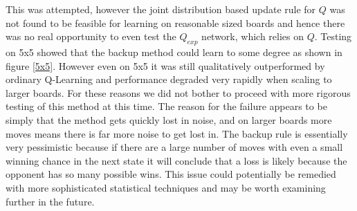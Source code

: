 \documentclass{article}
\begin{document}
This was attempted, however the joint distribution based update rule for $Q$ was not found to be feasible for learning on reasonable sized boards and hence there was no real opportunity to even test the $Q_{exp}$ network, which relies on $Q$.  Testing on 5x5 showed that the backup method could learn to some degree as shown in figure \ref{5x5}. However even on 5x5 it was still qualitatively outperformed by ordinary Q-Learning and performance degraded very rapidly when scaling to larger boards. For these reasons we did not bother to proceed with more rigorous testing of this method at this time. The reason for the failure appears to be simply that the method gets quickly lost in noise, and on larger boards more moves means there is far more noise to get lost in. The backup rule is essentially very pessimistic because if there are a large number of moves with even a small winning chance in the next state it will conclude that a loss is likely because the opponent has so many possible wins. This issue could potentially be remedied with more sophisticated statistical techniques and may be worth examining further in the future.
\end{document}
